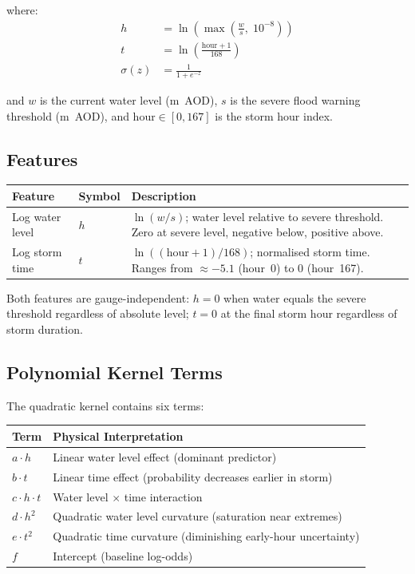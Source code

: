 \documentclass[11pt,a4paper]{article}
\begin{document}
\noindent where:
\begin{align}
h &= \ln\!\left(\max\!\left(\frac{w}{s},\; 10^{-8}\right)\right) \label{eq:h_feature} \\
t &= \ln\!\left(\frac{\text{hour} + 1}{168}\right) \label{eq:t_feature} \\
\sigma(z) &= \frac{1}{1 + e^{-z}} \label{eq:sigmoid}
\end{align}

\noindent and $w$ is the current water level (m~AOD), $s$ is the severe flood
warning threshold (m~AOD), and $\text{hour} \in [0, 167]$ is the storm hour
index.

\subsection{Features}

\begin{center}
\begin{tabular}{llp{8cm}}
\toprule
\textbf{Feature} & \textbf{Symbol} & \textbf{Description} \\
\midrule
Log water level & $h$ &
    $\ln(w/s)$; water level relative to severe threshold.
    Zero at severe level, negative below, positive above. \\
Log storm time & $t$ &
    $\ln((\text{hour}{+}1)/168)$; normalised storm time.
    Ranges from $\approx{-5.1}$ (hour~0) to $0$ (hour~167). \\
\bottomrule
\end{tabular}
\end{center}

\noindent Both features are gauge-independent: $h = 0$ when water equals the
severe threshold regardless of absolute level; $t = 0$ at the final storm hour
regardless of storm duration.

\subsection{Polynomial Kernel Terms}
The quadratic kernel contains six terms:

\begin{center}
\begin{tabular}{lp{10cm}}
\toprule
\textbf{Term} & \textbf{Physical Interpretation} \\
\midrule
$a \cdot h$ & Linear water level effect (dominant predictor) \\
$b \cdot t$ & Linear time effect (probability decreases earlier in storm) \\
$c \cdot h \cdot t$ & Water level $\times$ time interaction \\
$d \cdot h^2$ & Quadratic water level curvature (saturation near extremes) \\
$e \cdot t^2$ & Quadratic time curvature (diminishing early-hour uncertainty) \\
$f$ & Intercept (baseline log-odds) \\
\bottomrule
\end{tabular}
\end{center}
\end{document}
